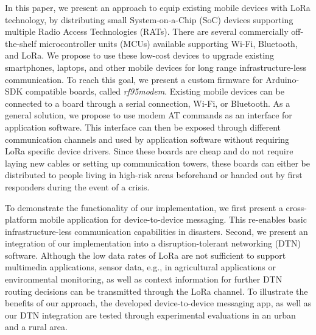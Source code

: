 In this paper, we present an approach to equip existing mobile devices with LoRa technology, by distributing small System-on-a-Chip (SoC) devices supporting multiple Radio Access Technologies (RATs). 
There are several commercially off-the-shelf microcontroller units (MCUs) available supporting Wi-Fi, Bluetooth, and LoRa.
We propose to use these low-cost devices to upgrade existing smartphones, laptops, and other mobile devices for long range infrastructure-less communication.
To reach this goal, we present a custom firmware for Arduino-SDK compatible boards, called \textit{rf95modem}.
Existing mobile devices can be connected to a board through a serial connection, Wi-Fi, or Bluetooth. 
As a general solution, we propose to use modem AT commands as an interface for application software. 
This interface can then be exposed through different communication channels and used by application software without requiring LoRa specific device drivers. 
Since these boards are cheap and do not require laying new cables or setting up communication towers, these boards can either be distributed to people living in high-risk areas beforehand or handed out by first responders during the event of a crisis.

To demonstrate the functionality of our implementation, we first present a cross-platform mobile application for device-to-device messaging. This re-enables basic infrastructure-less communication capabilities in disasters.
Second, we present an integration of our implementation into a disruption-tolerant networking (DTN) software.
Although the low data rates of LoRa are not sufficient to support multimedia applications, sensor data, e.g., in agricultural applications or environmental monitoring, as well as context information for further DTN routing decisions can be transmitted through the LoRa channel.
To illustrate the benefits of our approach,  the developed device-to-device messaging app, as well as our DTN integration are tested through experimental evaluations in an urban and a rural area. 

